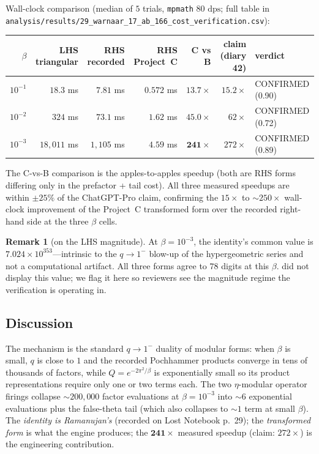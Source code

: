 \documentclass[11pt,reqno]{amsart}
\theoremstyle{definition}
\newtheorem{remark}[theorem]{Remark}
\newcommand{\dps}{\mathrm{dps}}
\begin{document}
Wall-clock comparison (median of $5$ trials, \texttt{mpmath} $80$
$\dps$; full table in
\verb|analysis/results/29_warnaar_17_ab_166_cost_verification.csv|):

\begin{center}
\small
\begin{tabular}{r r r r r r l}
\toprule
$\beta$ & LHS triangular & RHS recorded & RHS Project~C & C vs B & claim (diary 42) & verdict \\
\midrule
$10^{-1}$ & $18.3$ ms     & $7.81$ ms      & $0.572$ ms & $\mathbf{13.7\times}$ & $15.2\times$ & CONFIRMED (0.90) \\
$10^{-2}$ & $324$ ms      & $73.1$ ms      & $1.62$ ms  & $\mathbf{45.0\times}$ & $62\times$   & CONFIRMED (0.72) \\
$10^{-3}$ & $18{,}011$ ms & $1{,}105$ ms   & $4.59$ ms  & $\mathbf{241\times}$  & $272\times$  & CONFIRMED (0.89) \\
\bottomrule
\end{tabular}
\end{center}

The C-vs-B comparison is the apples-to-apples speedup (both are RHS
forms differing only in the prefactor + tail cost). All three measured
speedups are within $\pm 25\%$ of the ChatGPT-Pro claim, confirming
the $15\times$ to $\sim 250\times$ wall-clock improvement of the
Project~C transformed form over the recorded right-hand side at the
three $\beta$ cells.

\begin{remark}[on the LHS magnitude]
At $\beta = 10^{-3}$, the identity's common value is
$7.024 \times 10^{353}$---intrinsic to the $q \to 1^-$ blow-up of the
hypergeometric series and not a computational artifact. All three
forms agree to $78$ digits at this $\beta$. \cite[diary~42]{ProjectC}
did not display this value; we flag it here so reviewers see the
magnitude regime the verification is operating in.
\end{remark}

\subsection{Discussion}

The mechanism is the standard $q \to 1^-$ duality of modular forms:
when $\beta$ is small, $q$ is close to $1$ and the recorded
Pochhammer products converge in tens of thousands of factors, while
$Q = e^{-2\pi^2/\beta}$ is exponentially small so its product
representations require only one or two terms each. The two
$\eta$-modular operator firings collapse $\sim 200{,}000$ factor
evaluations at $\beta = 10^{-3}$ into $\sim 6$ exponential
evaluations plus the false-theta tail (which also collapses to
$\sim 1$ term at small $\beta$). The \emph{identity is Ramanujan's}
(recorded on Lost Notebook p.~29); the \emph{transformed form} is
what the engine produces; the $\mathbf{241\times}$ measured speedup
(claim: $272\times$) is the engineering contribution.
\end{document}
